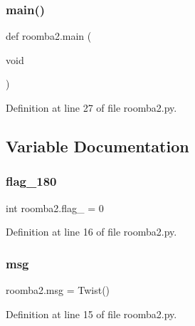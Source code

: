 \subsubsection{\texorpdfstring{main()}{main()}}
{\footnotesize\ttfamily def roomba2.\+main (\begin{DoxyParamCaption}\item[{void}]{ }\end{DoxyParamCaption})}



Definition at line 27 of file roomba2.\+py.



\subsection{Variable Documentation}
\mbox{\label{namespaceroomba2_a4876a4d06865fd61e97455e6d06d54d6}} 
\subsubsection{\texorpdfstring{flag\_180}{flag\_180}}
{\footnotesize\ttfamily int roomba2.\+flag\+\_ = 0}



Definition at line 16 of file roomba2.\+py.

\mbox{\label{namespaceroomba2_aaa28f0f5afb8a4fa21eadb03177aa441}} 
\subsubsection{\texorpdfstring{msg}{msg}}
{\footnotesize\ttfamily roomba2.\+msg = Twist()}



Definition at line 15 of file roomba2.\+py.

